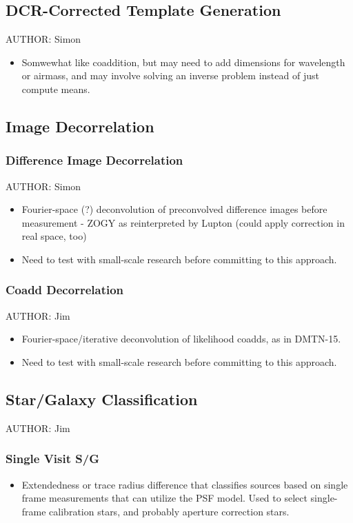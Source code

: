 \subsection{DCR-Corrected Template Generation}
\label{sec:acDCRTemplates}
AUTHOR: Simon
\begin{itemize}
\item Somwewhat like coaddition, but may need to add dimensions for wavelength or airmass, and may involve solving an inverse problem instead of just compute means.
\end{itemize}

\subsection{Image Decorrelation}
\label{sec:acImageDecorrelation}
\subsubsection{Difference Image Decorrelation}
\label{sec:acDiffImDecorrelation}
AUTHOR: Simon
\begin{itemize}
\item Fourier-space (?) deconvolution of preconvolved difference images before measurement - ZOGY as reinterpreted by Lupton (could apply correction in real space, too)
\item Need to test with small-scale research before committing to this approach.
\end{itemize}

\subsubsection{Coadd Decorrelation}
\label{sec:acCoaddDecorrelation}
AUTHOR: Jim
\begin{itemize}
\item Fourier-space/iterative deconvolution of likelihood coadds, as in DMTN-15.
\item Need to test with small-scale research before committing to this approach.
\end{itemize}

\subsection{Star/Galaxy Classification}
\label{sec:acClassification}
AUTHOR: Jim
\subsubsection{Single Visit S/G}
\label{sec:acSingleVisitClassification}
\begin{itemize}
\item Extendedness or trace radius difference that classifies sources based on single frame measurements that can utilize the PSF model.  Used to select single-frame calibration stars, and probably aperture correction stars.
\end{itemize}
